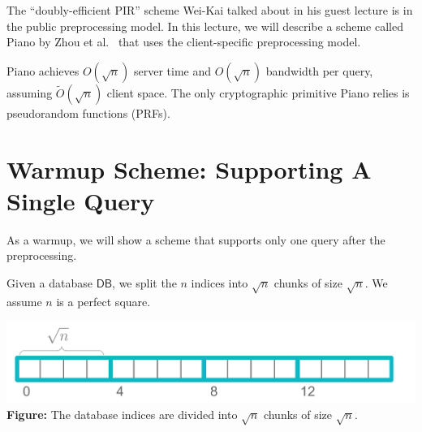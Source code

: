 The ``doubly-efficient PIR'' 
scheme Wei-Kai talked about in his guest lecture 
is in the public preprocessing model.
In this lecture, 
we will describe a scheme called Piano by Zhou et al.~\cite{zhou2023piano} 
that uses the client-specific preprocessing model.


Piano achieves $O(\sqrt{n})$ server time and $O(\sqrt{n})$ bandwidth per query, 
assuming $\widetilde{O}(\sqrt{n})$ client space. 
The only cryptographic primitive Piano relies is pseudorandom functions (PRFs).




\section{Warmup Scheme: Supporting A Single Query}
As a warmup, we will show a scheme that supports only one query after the preprocessing. 


Given a database $\mathsf{DB}$, we split the $n$ indices 
into $\sqrt{n}$ chunks of size $\sqrt{n}$.
We assume $n$ is a perfect square.

\begin{center}
    \includegraphics[scale=0.6]{chunks}\\
{\bf Figure:} The database indices are divided into $\sqrt{n}$ chunks of size $\sqrt{n}$. 
\end{center}

